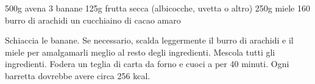 \begin{ingreds}
	500g avena 
	3 banane 
	125g frutta secca (albicocche, uvetta o altro)
	250g miele 
	160 burro di arachidi 
	un cucchiaino di cacao amaro 

\end{ingreds}

\begin{method}
	Schiaccia le banane. Se necessario, scalda leggermente il burro di arachidi e il miele per amalgamarli meglio al resto degli ingredienti. Mescola tutti gli ingredienti. Fodera un teglia di carta da forno e cuoci a  per 40 minuti. Ogni barretta dovrebbe avere circa 256 kcal.
\end{method}



